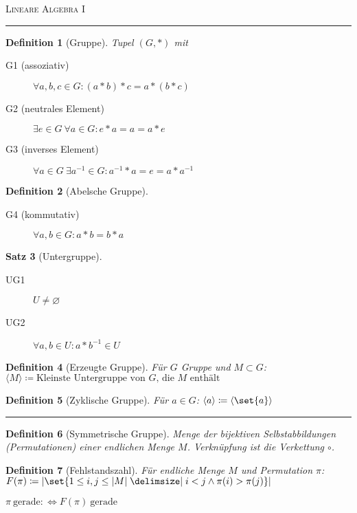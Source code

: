 \documentclass[a4paper]{article}
\newcounter{Sec}
\theoremstyle{marginbreak}
\newtheorem{definition}{Definition}[Sec]
\newtheorem{satz}[definition]{Satz}
\newcommand{\sep}{%
	\rule{\textwidth}{0.3pt}%
	\stepcounter{Sec}%
	}
\begin{document}
	\textsc{Lineare Algebra I}

	\sep
	\begin{definition}[Gruppe]
		Tupel $(G, *)$ mit
		\begin{description}
			\item[G1 (assoziativ)] $\forall a, b, c \in G: (a * b) * c = a * (b * c)$
			\item[G2 (neutrales Element)] $\exists e \in G~\forall a \in G: e * a = a = a * e$
			\item[G3 (inverses Element)] $\forall a \in G~\exists a^{-1} \in G: a^{-1} * a = e = a * a^{-1}$
		\end{description}
	\end{definition}
	\begin{definition}[Abelsche Gruppe]
		\begin{description}
			\item[G4 (kommutativ)] $\forall a, b \in G: a * b = b * a$
		\end{description}
	\end{definition}
	\begin{satz}[Untergruppe]
		\begin{description}
			\item[UG1] $U \neq \varnothing$
			\item[UG2] $\forall a, b \in U: a * b^{-1} \in U$
		\end{description}
	\end{satz}
	\begin{definition}[Erzeugte Gruppe]
		Für $G$ Gruppe und $M \subset G$: $\langle M\rangle \coloneqq \text{Kleinste Untergruppe von $G$, die $M$ enthält}$
	\end{definition}
	\begin{definition}[Zyklische Gruppe]
		Für $a \in G$: $\langle a\rangle \coloneqq \langle\set{a}\rangle$
	\end{definition}
	\sep
	\begin{definition}[Symmetrische Gruppe]
		Menge der bijektiven Selbstabbildungen (Permutationen) einer endlichen Menge $M$.
		Verknüpfung ist die Verkettung $\circ$.
	\end{definition}
	\begin{definition}[Fehlstandszahl]
		Für endliche Menge $M$ und Permutation $\pi$:
		$F(\pi) \coloneqq \abs{\set{1 \leq i, j \leq \abs{M} \given i < j \wedge \pi(i) > \pi(j)}}$

		$\pi~\text{gerade} :\Longleftrightarrow F(\pi)~\text{gerade}$
	\end{definition}
\end{document}
